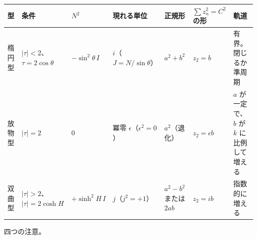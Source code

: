 \documentclass[
  a4paper,
]{ltjsarticle}
\newcounter{none} %
\begin{document}
{\def\LTcaptype{none} %
\begin{longtable}[]{@{}
  >{\raggedright\arraybackslash}p{}
  >{\raggedright\arraybackslash}p{}
  >{\raggedright\arraybackslash}p{}
  >{\raggedright\arraybackslash}p{}
  >{\raggedright\arraybackslash}p{}
  >{\raggedright\arraybackslash}p{}
  >{\raggedright\arraybackslash}p{}@{}}
\toprule\noalign{}
\begin{minipage}[b]{\linewidth}\raggedright
型
\end{minipage} & \begin{minipage}[b]{\linewidth}\raggedright
条件
\end{minipage} & \begin{minipage}[b]{\linewidth}\raggedright
\(N^2\)
\end{minipage} & \begin{minipage}[b]{\linewidth}\raggedright
現れる単位
\end{minipage} & \begin{minipage}[b]{\linewidth}\raggedright
正規形
\end{minipage} & \begin{minipage}[b]{\linewidth}\raggedright
\(\sum z_n^2=C^2\) の形
\end{minipage} & \begin{minipage}[b]{\linewidth}\raggedright
軌道
\end{minipage} \\
\midrule\noalign{}
\endhead
\bottomrule\noalign{}
\endlastfoot
楕円型 & \(\lvert\tau\rvert<2\)、\(\tau=2\cos\theta\) &
\(-\sin^2\theta\,I\) & \(i\)（\(J=N/\sin\theta\)） & \(a^2+b^2\) &
\(z_2=b\) & 有界。閉じるか準周期 \\
放物型 & \(\lvert\tau\rvert=2\) & \(0\) & 冪零
\(\epsilon\)（\(\epsilon^2=0\)） & \(a^2\)（退化） & \(z_2=\epsilon b\)
& \(a\) が一定で、\(b\) が \(k\) に比例して増える \\
双曲型 & \(\lvert\tau\rvert>2\)、\(\lvert\tau\rvert=2\cosh H\) &
\(+\sinh^2H\,I\) & \(j\)（\(j^2=+1\)） & \(a^2-b^2\) または \(2ab\) &
\(z_2=ib\) & 指数的に増える \\
\end{longtable}
}

四つの注意。
\end{document}
